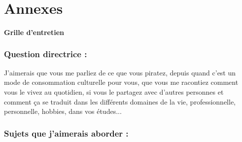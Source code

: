 \chapter{Annexes}

\subsubsection*{Grille d'entretien \hrulefill}

        \subsection*{Question directrice : }

        \guillemetleft J'aimerais que vous me parliez de ce que vous piratez, depuis quand c'est un mode de consommation culturelle pour vous, que vous me racontiez comment vous le vivez au quotidien, si vous le partagez avec d'autres personnes et comment ça se traduit dans les différents domaines de la vie, professionnelle, personnelle, hobbies, dans vos études...\guillemetright

        \subsection*{Sujets que j'aimerais aborder : }
        
